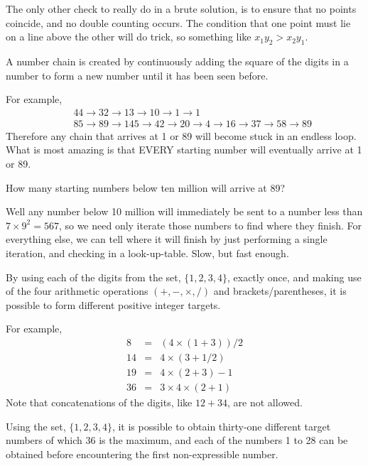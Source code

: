 The only other check to really do in a brute solution, is to ensure that no points coincide, and no double counting occurs.
The condition that one point must lie on a line above the other will do trick, so something like $x_1y_2 > x_2y_1$.




A number chain is created by continuously adding the square of the digits in a number to form a new number until it has been seen before.

For example,
\begin{eqnarray*}
&&44 \to 32 \to 13 \to 10 \to 1 \to 1 \\
&&85 \to 89 \to 145 \to 42 \to 20 \to 4 \to 16 \to 37 \to 58 \to 89
\end{eqnarray*}
Therefore any chain that arrives at 1 or 89 will become stuck in an endless loop. What is most amazing is that EVERY starting number will eventually arrive at 1 or 89.

How many starting numbers below ten million will arrive at 89?

Well any number below 10 million will immediately be sent to a number less than $7\times 9^2 = 567$, so we need only iterate
those numbers to find where they finish.  For everything else, we can tell where it will finish by just performing a single
iteration, and checking in a look-up-table.  Slow, but fast enough.




By using each of the digits from the set, $\{1, 2, 3, 4\}$, exactly once, and making use of the four arithmetic operations
$(+, -, \times, /)$ and brackets/parentheses, it is possible to form different positive integer targets.

For example,
\begin{eqnarray*}
8  &= &(4 \times (1 + 3)) / 2   \\
14 &= &4 \times (3 + 1 / 2)     \\
19 &= &4 \times (2 + 3) - 1     \\
36 &= &3 \times 4 \times (2 + 1)
\end{eqnarray*}
Note that concatenations of the digits, like $12 + 34$, are not allowed.

Using the set, $\{1, 2, 3, 4\}$, it is possible to obtain thirty-one different target numbers of which 36 is the maximum, and each of the numbers 1 to 28 can be obtained before encountering the first non-expressible number.

